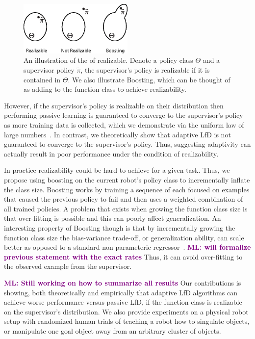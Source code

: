 \documentclass[10pt, conference]{ieeeconf}      %
\newcommand{\mlnote}[1]{\ifthenelse{ \boolean{include-notes}}%
 {\textcolor{purple}{\textbf{ML: #1}}}{}}
\begin{document}
\begin{figure}
\includegraphics[width=0.5\textwidth]{f_figs/realizibility.eps}
\caption{
    \footnotesize
An illustration of the  of realizable. Denote a policy class $\Theta$ and a supervisor policy $\tilde{\pi}$, the supervisor's policy is realizable if it is contained in $\Theta$. We also illustrate Boosting, which can be thought of as adding to the function class to achieve realizability.}
\vspace*{-20pt}
\label{fig:teaserl}
\end{figure}

However, if the supervisor's policy is realizable on their distribution then performing  passive learning is guaranteed to converge to the supervisor's policy as more training data is collected, which we  demonstrate via the uniform law of large numbers~\cite{vapnik2013nature}.  In contrast, we theoretically show that adaptive LfD is not guaranteed to converge to the supervisor's policy. Thus, suggesting adaptivity can actually result in poor performance under the condition of realizability. 

In practice realizability could be hard to achieve for a given task. Thus, we propose using boosting on the current robot's policy class to incrementally inflate the class size. Boosting works by training a sequence of each focused on examples that caused the previous policy to fail and then uses a weighted combination of all trained policies. A problem that exists when growing the function class size is that over-fitting is possible and this can poorly affect generalization. An interesting property of Boosting though is that by incrementally growing the function class size the bias-variance trade-off, or generalization ability, can  scale better as opposed to a standard non-parameteric regressor~\cite{buhlmann2003boosting}. \mlnote{will formalize previous statement with the exact rates} Thus, it can avoid over-fitting to the observed example from the supervisor. 

\mlnote{Still working on how to summarize all results}
Our contributions is showing, both theoretically and empirically that adaptive LfD algorithms can achieve worse performance versus passive LfD, if the function class is realizable on the supervisor's distribution. We also provide experiments on a physical robot setup with randomized human trials of teaching a robot how to singulate objects, or manipulate one goal object away from an arbitrary cluster of objects. 
\end{document}
